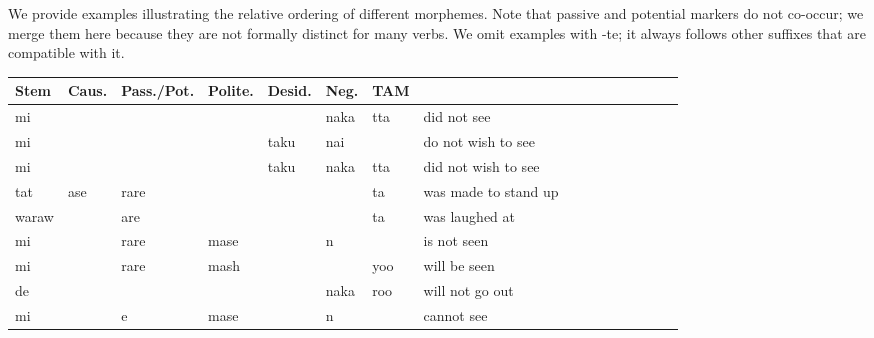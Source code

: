 \documentclass[11pt,letterpaper]{article}
\begin{document}




We provide examples illustrating the relative ordering of different morphemes.
Note that passive and potential markers do not co-occur; we merge them here because they are not formally distinct for many verbs.
We omit examples with -te; it always follows other suffixes that are compatible with it.


	\begin{center}
\begin{tabular}{lllllllll|lllllll}
Stem & Caus. & Pass./Pot. & Polite. & Desid. & Neg. & TAM & \\ \hline
mi &          &       &            &          & naka     & tta    & did not see \cite[153]{vaccari1938complete}\\
mi &          &       &            & taku     & nai      &         & do not wish to see \cite[98]{vaccari1938complete} \\
mi &          &       &            & taku     & naka    & tta       & did not wish to see \cite[98]{vaccari1938complete} \\
tat & ase     & rare  &            &          &         & ta         & was made to stand up \cite[396]{kaiser2013japanese} \\
waraw  &       & are  &            &           &         & ta        & was laughed at \cite[384]{kaiser2013japanese} \\
mi     &       & rare & mase       &          & n        &           & is not seen \cite[337]{vaccari1938complete} \\
mi     &       & rare & mash      &           &          & yoo      & will be seen \cite[337]{vaccari1938complete} \\
de     &       &     &            &           & naka     & roo      & will not go out \cite[170]{vaccari1938complete} \\
mi     &       &     e & mase       &           & n        &          & cannot see \cite[349]{vaccari1938complete} \\
\end{tabular}
	\end{center}
\end{document}
